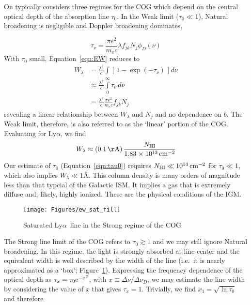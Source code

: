 \documentclass[graybox]{svmult}
\def\lya{Ly$\alpha$}
\def\ltk{\left [ \,}
\def\rtk{\, \right  ] }
\def\sci#1{{\; \times \; 10^{#1}}}
\def\intl{\int\limits}
\def\rme{{\rm e}}
\newcommand{\mnhi}{N_{\rm HI}}
\def\cm#1{\, {\rm cm^{#1}}}
\begin{document}
On typically considers three regimes for the COG
which depend on the central optical depth of the
absorption line $\tau_0$.
In the Weak limit ($\tau_0 \ll 1$), Natural 
broadening is negligible and Doppler broadening
dominates,

\begin{equation}
\tau_\nu = \frac{\pi e^2}{m_e c} \lambda f_{jk} N_j \phi_D(\nu) 
\end{equation}
With $\tau_0$ small, Equation~\ref{eqn:EW} reduces to
\begin{align}
W_\lambda &= \frac{\lambda^2}{c} \int \ltk 1 - \exp(-\tau_\nu) \rtk d\nu \\
  & \approx \frac{\lambda^2}{c} \intl_0^\infty \tau_\nu \, d\nu \\
  & = \frac{\lambda^2}{c} \frac{\pi e^2}{m_e c} f_{jk} N_j 
\end{align}
revealing a linear relationship between $W_\lambda$ and $N_j$
and no dependence on $b$.
The Weak limit, therefore, is also referred
to as the `linear' portion of the COG.
Evaluating for \lya, we find
\begin{equation}
W_\lambda \approx (0.1 \, {\rm \AA}) \, \frac{N_{\rm HI}}{1.83 \sci{13} \cm{-2}} 
\end{equation}
Our estimate of $\tau_0$ (Equation~\ref{eqn:tau0})
requires $\mnhi \ll 10^{14} \cm{-2}$ for $\tau_0 \ll 1$,
which also implies $W_\lambda \ll 1$\AA.
This column density is many orders of magnitude less than 
that typcial of the Galactic ISM.  It implies a gas that 
is extremely diffuse and, likely, highly ionized.  These
are the physical conditions of the IGM.



%
\begin{figure}[b]
\sidecaption
\texttt{[image: Figures/ew\_sat\_fill]}
%
%
\caption{Saturated \lya\ line in the Strong regime of the
COG
}
\label{fig:EWstrong}       %
\end{figure}



The Strong line limit of the COG refers to $\tau_0 \gtrsim 1$
and we may still ignore Natural broadening.
In this regime, the light is strongly absorbed at line-center
and the equivalent width is well described by the width
of the line (i.e.\ it is nearly approximated as a `box';
Figure~\ref{fig:EWstrong}).
Expressing the frequency dependence of the optical
depth as $\tau_x = \tau_0 \rme^{-x^2}$, with
$x \equiv \Delta \nu / \Delta \nu_D$, we may estimate the 
line width by 
considering the value of $x$ that gives $\tau_x = 1$.
Trivially, we find $x_1 = \sqrt{\ln \tau_0}$ and therefore
\end{document}
